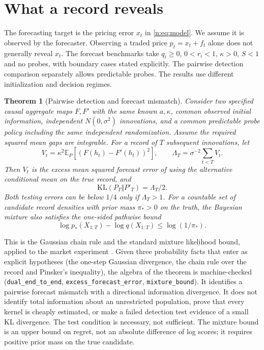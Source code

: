 \documentclass[12pt]{article}
\newtheorem{theorem}{Theorem}[section]
\theoremstyle{definition}
\theoremstyle{remark}
\begin{document}
\section{What a record reveals}\label{n:irr_sec}

The forecasting target is the pricing error $x_t$ in \eqref{n:eq:model}. We assume it is observed by the forecaster. Observing a traded price $p_t=x_t+f_t$ alone does not generally reveal $x_t$. The forecast benchmarks take $q_i\ge0$, $0<r_i<1$, $\kappa>0$, $S<1$ and no probes, with boundary cases stated explicitly. The pairwise detection comparison separately allows predictable probes. The results use different initialization and decision regimes.


\begin{theorem}[Pairwise detection and forecast mismatch]\label{n:dual}
Consider two specified causal aggregate maps $F,F'$ with the same known $a,\kappa$, common observed initial information, independent $N(0,\sigma^2)$ innovations, and a common predictable probe policy including the same independent randomization. Assume the required squared mean gaps are integrable. For a record of $T$ subsequent innovations, let
\[
V_t=\kappa^2\mathbb E_P[(F(h_t)-F'(h_t))^2],\qquad
\Lambda_T=\sigma^{-2}\sum_{t<T}V_t.
\]
Then $V_t$ is the excess mean squared forecast error of using the alternative conditional mean on the true record, and
\[
\mathrm{KL}(P_T\Vert P'_T)=\Lambda_T/2.
\]
Both testing errors can be below $1/4$ only if $\Lambda_T>1$.
For a countable set of candidate record densities with prior mass $\pi_*>0$ on the truth, the Bayesian mixture also satisfies the one-sided pathwise bound
\[
\log p_*(X_{1:T})-\log q(X_{1:T})\le\log(1/\pi_*).
\]
\end{theorem}

This is the Gaussian chain rule and the standard mixture likelihood bound, applied to the market experiment \citep{dawid1984,vovk2001}. Given three probability facts that enter as explicit hypotheses (the one-step Gaussian divergence, the chain rule over the record and Pinsker's inequality), the algebra of the theorem is machine-checked (\nolinkurl{dual_end_to_end}, \nolinkurl{excess_forecast_error}, \nolinkurl{mixture_bound}). It identifies a pairwise forecast mismatch with a directional information divergence. It does not identify total information about an unrestricted population, prove that every kernel is cheaply estimated, or make a failed detection test evidence of a small KL divergence. The test condition is necessary, not sufficient. The mixture bound is an upper bound on regret, not an absolute difference of log scores; it requires positive prior mass on the true candidate.
\end{document}
